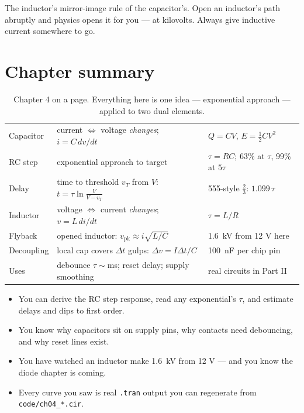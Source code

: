 \begin{tripwire}
The inductor's mirror-image rule of the capacitor's. Open an inductor's path
abruptly and physics opens it for you — at kilovolts. Always give inductive
current somewhere to go.
\end{tripwire}

\section{Chapter summary}
\label{sec:ch4summary}

\begin{table}[htbp]
\centering\small
\begin{tabularx}{\linewidth}{@{}lY l@{}}
\toprule
{} &  &  \\
\midrule
Capacitor & current $\Leftrightarrow$ voltage \emph{changes}; $i=C\,dv/dt$ & $Q=CV$, $E=\tfrac12 CV^2$ \\
RC step & exponential approach to target & $\tau=RC$; 63\% at $\tau$, 99\% at $5\tau$ \\
Delay & time to threshold $v_T$ from $V$: $t=\tau\ln\!\frac{V}{V-v_T}$ & 555-style $\tfrac23$: $1.099\,\tau$ \\
Inductor & voltage $\Leftrightarrow$ current \emph{changes}; $v=L\,di/dt$ & $\tau=L/R$ \\
Flyback & opened inductor: $v_{\mathrm{pk}}\approx i\sqrt{L/C}$ & \qty{1.6}{\kilo\volt} from 12 V here \\
Decoupling & local cap covers $\Delta t$ gulps: $\Delta v=I\Delta t/C$ & \qty{100}{\nano\farad} per chip pin \\
Uses & debounce $\tau\sim$ms; reset delay; supply smoothing & real circuits in Part II \\
\bottomrule
\end{tabularx}
\caption{Chapter 4 on a page. Everything here is one idea — exponential
approach — applied to two dual elements.}
\label{tab:ch4summary}
\end{table}

\begin{wins}
\begin{itemize}
\item You can derive the RC step response, read any exponential's $\tau$, and
estimate delays and dips to first order.
\item You know why capacitors sit on supply pins, why contacts need
debouncing, and why reset lines exist.
\item You have watched an inductor make \qty{1.6}{\kilo\volt} from 12 V — and
you know the diode chapter is coming.
\item Every curve you saw is real \texttt{.tran} output you can regenerate
from \texttt{code/ch04\_*.cir}.
\end{itemize}
\end{wins}

